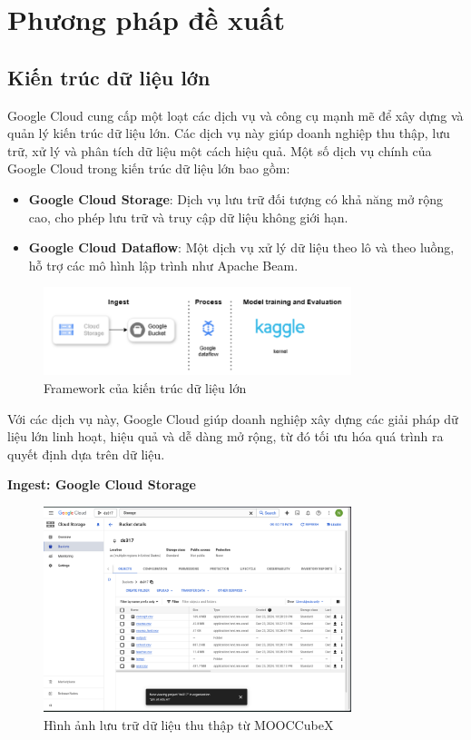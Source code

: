 \section{Phương pháp đề xuất}
\subsection{Kiến trúc dữ liệu lớn}

Google Cloud cung cấp một loạt các dịch vụ và công cụ mạnh mẽ để xây dựng và quản lý kiến trúc dữ liệu lớn. Các dịch vụ này giúp doanh nghiệp thu thập, lưu trữ, xử lý và phân tích dữ liệu một cách hiệu quả. Một số dịch vụ chính của Google Cloud trong kiến trúc dữ liệu lớn bao gồm:

\begin{itemize}
    \item \textbf{Google Cloud Storage}: Dịch vụ lưu trữ đối tượng có khả năng mở rộng cao, cho phép lưu trữ và truy cập dữ liệu không giới hạn.
    \item \textbf{Google Cloud Dataflow}: Một dịch vụ xử lý dữ liệu theo lô và theo luồng, hỗ trợ các mô hình lập trình như Apache Beam.
\end{itemize}
\begin{figure}[H]
    \centering
    \includegraphics[width=0.8\textwidth]{figures/78.png}
    \caption{Framework của kiến trúc dữ liệu lớn}
\end{figure}
Với các dịch vụ này, Google Cloud giúp doanh nghiệp xây dựng các giải pháp dữ liệu lớn linh hoạt, hiệu quả và dễ dàng mở rộng, từ đó tối ưu hóa quá trình ra quyết định dựa trên dữ liệu.

\textbf{Ingest: Google Cloud Storage}
\begin{figure}[H]
    \centering
    \includegraphics[width=0.8\textwidth]{figures/73.png}
    \caption{Hình ảnh lưu trữ dữ liệu thu thập từ MOOCCubeX}
\end{figure}

